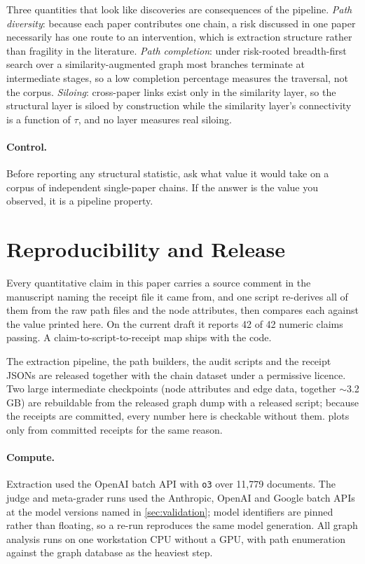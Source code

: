 \documentclass[10pt,twocolumn,letterpaper]{article}
\begin{document}
Three quantities that look like discoveries are consequences of the pipeline.
\emph{Path diversity}: because each paper contributes one chain, a risk discussed
in one paper necessarily has one route to an intervention, which is extraction
structure rather than fragility in the literature. \emph{Path completion}: under
risk-rooted breadth-first search over a similarity-augmented graph most branches
terminate at intermediate stages, so a low completion percentage measures the
traversal, not the corpus. \emph{Siloing}: cross-paper links exist only in the
similarity layer, so the structural layer is siloed by construction while the
similarity layer's connectivity is a function of $\tau$, and no layer measures
real siloing.

\paragraph{Control.} Before reporting any structural statistic, ask what value it
would take on a corpus of independent single-paper chains. If the answer is the
value you observed, it is a pipeline property.

\section{Reproducibility and Release}
\label{sec:repro}

Every quantitative claim in this paper carries a source comment in the manuscript
naming the receipt file it came from, and one script re-derives all of them from
the raw path files and the node attributes, then compares each against the value
printed here. On the current draft it reports 42 of 42 numeric claims passing. A claim-to-script-to-receipt map ships with the code.

The extraction pipeline, the path builders, the audit scripts and the receipt
JSONs are released together with the chain dataset under a permissive licence.
Two large intermediate checkpoints (node attributes and edge data, together
$\sim$3.2 GB) are rebuildable from the released graph dump with a released
script; because the receipts are committed, every number here is checkable
without them.  plots only from committed receipts for the same
reason.

\paragraph{Compute.} Extraction used the OpenAI batch API with \texttt{o3} over
11{,}779 documents. The judge and meta-grader runs used the Anthropic, OpenAI and
Google batch APIs at the model versions named in \cref{sec:validation}; model
identifiers are pinned rather than floating, so a re-run reproduces the same model
generation. All graph analysis runs on one workstation CPU without a GPU, with
path enumeration against the graph database as the heaviest step.
\end{document}
